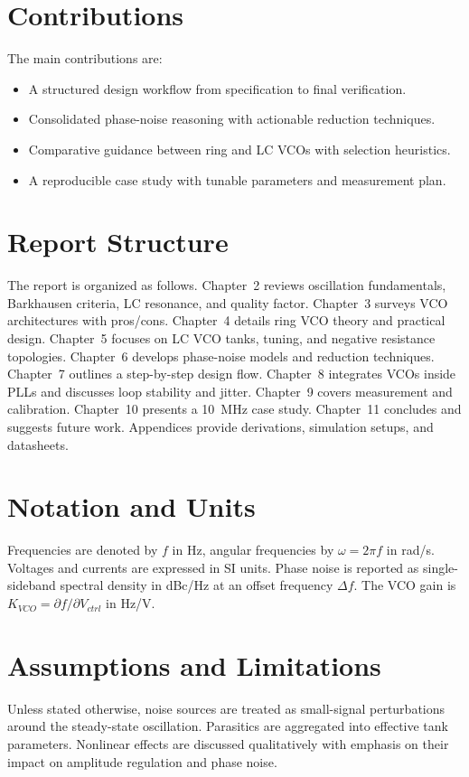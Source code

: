 \section{Contributions}
The main contributions are:
\begin{itemize}
  \item A structured design workflow from specification to final verification.
  \item Consolidated phase-noise reasoning with actionable reduction techniques.
  \item Comparative guidance between ring and LC VCOs with selection heuristics.
  \item A reproducible case study with tunable parameters and measurement plan.
\end{itemize}

\section{Report Structure}
The report is organized as follows. Chapter~2 reviews oscillation fundamentals, Barkhausen criteria, LC resonance, and quality factor. Chapter~3 surveys VCO architectures with pros/cons. Chapter~4 details ring VCO theory and practical design. Chapter~5 focuses on LC VCO tanks, tuning, and negative resistance topologies. Chapter~6 develops phase-noise models and reduction techniques. Chapter~7 outlines a step-by-step design flow. Chapter~8 integrates VCOs inside PLLs and discusses loop stability and jitter. Chapter~9 covers measurement and calibration. Chapter~10 presents a 10~MHz case study. Chapter~11 concludes and suggests future work. Appendices provide derivations, simulation setups, and datasheets.

\section{Notation and Units}
Frequencies are denoted by \(f\) in Hz, angular frequencies by \(\omega = 2\pi f\) in rad/s. Voltages and currents are expressed in SI units. Phase noise is reported as single-sideband spectral density in dBc/Hz at an offset frequency \(\Delta f\). The VCO gain is \(K_{VCO} = \partial f/\partial V_{ctrl}\) in Hz/V.

\section{Assumptions and Limitations}
Unless stated otherwise, noise sources are treated as small-signal perturbations around the steady-state oscillation. Parasitics are aggregated into effective tank parameters. Nonlinear effects are discussed qualitatively with emphasis on their impact on amplitude regulation and phase noise.

